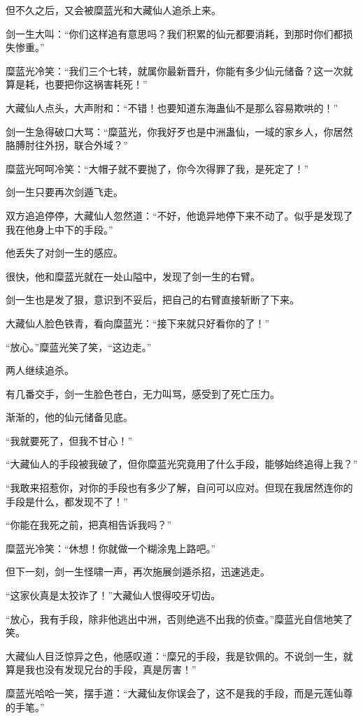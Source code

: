 \begin{this_body}
但不久之后，又会被糜蓝光和大藏仙人追杀上来。

剑一生大叫：“你们这样追有意思吗？我们积累的仙元都要消耗，到那时你们都损失惨重。”

糜蓝光冷笑：“我们三个七转，就属你最新晋升，你能有多少仙元储备？这一次就算是耗，也要把你这祸害耗死！”

大藏仙人点头，大声附和：“不错！也要知道东海蛊仙不是那么容易欺哄的！”

剑一生急得破口大骂：“糜蓝光，你我好歹也是中洲蛊仙，一域的家乡人，你居然胳膊肘往外拐，联合外域？”

糜蓝光呵呵冷笑：“大帽子就不要抛了，你今次得罪了我，是死定了！”

剑一生只要再次剑遁飞走。

双方追追停停，大藏仙人忽然道：“不好，他诡异地停下来不动了。似乎是发现了我在他身上中下的手段。”

他丢失了对剑一生的感应。

很快，他和糜蓝光就在一处山隘中，发现了剑一生的右臂。

剑一生也是发了狠，意识到不妥后，把自己的右臂直接斩断了下来。

大藏仙人脸色铁青，看向糜蓝光：“接下来就只好看你的了！”

“放心。”糜蓝光笑了笑，“这边走。”

两人继续追杀。

有几番交手，剑一生脸色苍白，无力叫骂，感受到了死亡压力。

渐渐的，他的仙元储备见底。

“我就要死了，但我不甘心！”

“大藏仙人的手段被我破了，但你糜蓝光究竟用了什么手段，能够始终追得上我？”

“我敢来招惹你，对你的手段也有多少了解，自问可以应对。但现在我居然连你的手段是什么，都发现不了！”

“你能在我死之前，把真相告诉我吗？”

糜蓝光冷笑：“休想！你就做一个糊涂鬼上路吧。”

但下一刻，剑一生怪啸一声，再次施展剑遁杀招，迅速逃走。

“这家伙真是太狡诈了！”大藏仙人恨得咬牙切齿。

“放心，我有手段，除非他逃出中洲，否则绝逃不出我的侦查。”糜蓝光自信地笑了笑。

大藏仙人目泛惊异之色，他感叹道：“糜兄的手段，我是钦佩的。不说剑一生，就算是我也没有发现兄台的手段，真是厉害！”

糜蓝光哈哈一笑，摆手道：“大藏仙友你误会了，这不是我的手段，而是元莲仙尊的手笔。”


\end{this_body}
